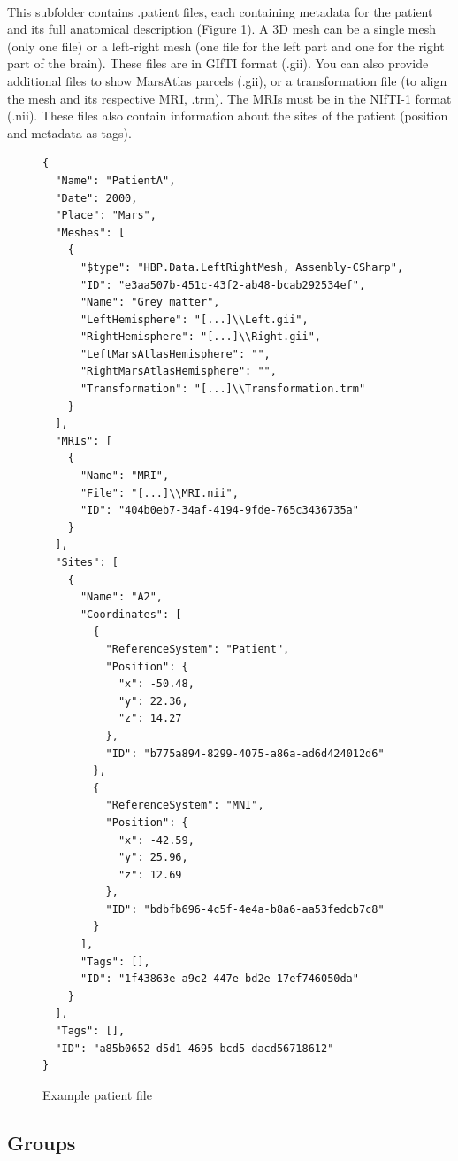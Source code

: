 \documentclass[a4paper]{article}
\begin{document}
\paragraph{} This subfolder contains .patient files, each containing metadata for the patient and its full anatomical description (Figure \ref{patientFile}). A 3D mesh can be a single mesh (only one file) or a left-right mesh (one file for the left part and one for the right part of the brain). These files are in GIfTI format (.gii). You can also provide additional files to show MarsAtlas parcels (.gii), or a transformation file (to align the mesh and its respective MRI, .trm). The MRIs must be in the NIfTI-1 format (.nii). These files also contain information about the sites of the patient (position and metadata as tags).
\begin{figure}[H]
\begin{lstlisting}
{
  "Name": "PatientA",
  "Date": 2000,
  "Place": "Mars",
  "Meshes": [
    {
      "$type": "HBP.Data.LeftRightMesh, Assembly-CSharp",
      "ID": "e3aa507b-451c-43f2-ab48-bcab292534ef",
      "Name": "Grey matter",
      "LeftHemisphere": "[...]\\Left.gii",
      "RightHemisphere": "[...]\\Right.gii",
      "LeftMarsAtlasHemisphere": "",
      "RightMarsAtlasHemisphere": "",
      "Transformation": "[...]\\Transformation.trm"
    }
  ],
  "MRIs": [
    {
      "Name": "MRI",
      "File": "[...]\\MRI.nii",
      "ID": "404b0eb7-34af-4194-9fde-765c3436735a"
    }
  ],
  "Sites": [
    {
      "Name": "A2",
      "Coordinates": [
        {
          "ReferenceSystem": "Patient",
          "Position": {
            "x": -50.48,
            "y": 22.36,
            "z": 14.27
          },
          "ID": "b775a894-8299-4075-a86a-ad6d424012d6"
        },
        {
          "ReferenceSystem": "MNI",
          "Position": {
            "x": -42.59,
            "y": 25.96,
            "z": 12.69
          },
          "ID": "bdbfb696-4c5f-4e4a-b8a6-aa53fedcb7c8"
        }
      ],
      "Tags": [],
      "ID": "1f43863e-a9c2-447e-bd2e-17ef746050da"
    }
  ],
  "Tags": [],
  "ID": "a85b0652-d5d1-4695-bcd5-dacd56718612"
}
\end{lstlisting}
\caption{\label{patientFile}Example patient file}
\end{figure}
\subsection{Groups}
\end{document}
